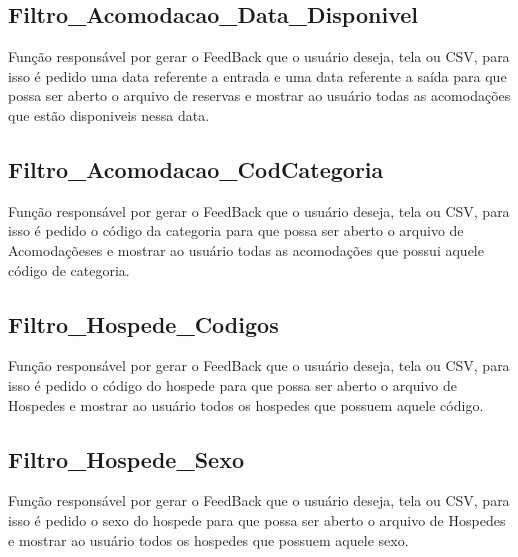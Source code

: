 \documentclass{article}
\begin{document}
\subsection{Filtro\_Acomodacao\_Data\_Disponivel}
	Função responsável por gerar o FeedBack que o usuário deseja, tela ou CSV, para isso é pedido uma data referente a entrada e uma data referente a saída para que possa ser aberto o arquivo de reservas e mostrar ao usuário todas as acomodações que estão disponiveis nessa data.

\subsection{Filtro\_Acomodacao\_CodCategoria}
	Função responsável por gerar o FeedBack que o usuário deseja, tela ou CSV, para isso é pedido o código da categoria para que possa ser aberto o arquivo de Acomodaçõeses e mostrar ao usuário todas as acomodações que possui aquele código de categoria.

\subsection{Filtro\_Hospede\_Codigos}
	Função responsável por gerar o FeedBack que o usuário deseja, tela ou CSV, para isso é pedido o código do hospede para que possa ser aberto o arquivo de Hospedes e mostrar ao usuário todos os hospedes que possuem aquele código.	

\subsection{Filtro\_Hospede\_Sexo}
	Função responsável por gerar o FeedBack que o usuário deseja, tela ou CSV, para isso é pedido o sexo do hospede para que possa ser aberto o arquivo de Hospedes e mostrar ao usuário todos os hospedes que possuem aquele sexo.	
	
\end{document}
